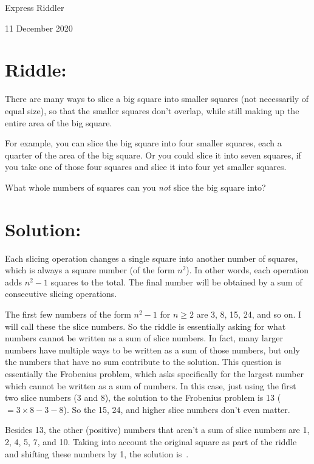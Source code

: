 \documentclass{article}
\begin{document}
\pagestyle{empty} %

\begin{center}
{\LARGE Express Riddler}

\vspace{0.15in}

{\Large 11 December 2020}
\end{center}


\section*{Riddle:}

There are many ways to slice a big square into smaller squares (not necessarily of equal size), so that the smaller squares don’t overlap, while still making up the entire area of the big square.

For example, you can slice the big square into four smaller squares, each a quarter of the area of the big square.
Or you could slice it into seven squares, if you take one of those four squares and slice it into four yet smaller squares.

What whole numbers of squares can you \textit{not} slice the big square into?


\section*{Solution:}

Each slicing operation changes a single square into another number of squares, which is always a square number (of the form $n^{2}$).
In other words, each operation adds $n^{2}-1$ squares to the total.
The final number will be obtained by a sum of consecutive slicing operations.

The first few numbers of the form $n^{2}-1$ for $n\geq2$ are 3, 8, 15, 24, and so on.
I will call these the slice numbers.
So the riddle is essentially asking for what numbers cannot be written as a sum of slice numbers.
In fact, many larger numbers have multiple ways to be written as a sum of those numbers, but only the numbers that have no sum contribute to the solution.
This question is essentially the Frobenius problem, which asks specifically for the largest number which cannot be written as a sum of numbers.
In this case, just using the first two slice numbers (3 and 8), the solution to the Frobenius problem is 13 ($=3\times8-3-8$).
So the 15, 24, and higher slice numbers don't even matter.

Besides 13, the other (positive) numbers that aren't a sum of slice numbers are 1, 2, 4, 5, 7, and 10.
Taking into account the original square as part of the riddle and shifting these numbers by 1, the solution is
\,.
\end{document}
